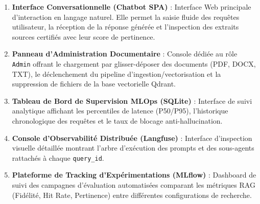 \begin{enumerate}
    \item \textbf{Interface Conversationnelle (Chatbot SPA)} : Interface Web principale d'interaction en langage naturel. Elle permet la saisie fluide des requêtes utilisateur, la réception de la réponse générée et l'inspection des extraits sources certifiés avec leur score de pertinence.
    \item \textbf{Panneau d'Administration Documentaire} : Console dédiée au rôle \texttt{Admin} offrant le chargement par glisser-déposer des documents (PDF, DOCX, TXT), le déclenchement du pipeline d'ingestion/vectorisation et la suppression de fichiers de la base vectorielle Qdrant.
    \item \textbf{Tableau de Bord de Supervision MLOps (SQLite)} : Interface de suivi analytique affichant les percentiles de latence (P50/P95), l'historique chronologique des requêtes et le taux de blocage anti-hallucination.
    \item \textbf{Console d'Observabilité Distribuée (Langfuse)} : Interface d'inspection visuelle détaillée montrant l'arbre d'exécution des prompts et des sous-agents rattachés à chaque \texttt{query\_id}.
    \item \textbf{Plateforme de Tracking d'Expérimentations (MLflow)} : Dashboard de suivi des campagnes d'évaluation automatisées comparant les métriques RAG (Fidélité, Hit Rate, Pertinence) entre différentes configurations de recherche.
\end{enumerate}
